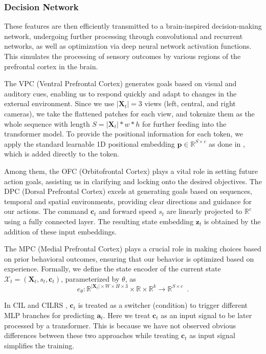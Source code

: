 \subsubsection{Decision Network}
These features are then efficiently transmitted to a brain-inspired decision-making network, undergoing further processing through convolutional and recurrent networks, as well as optimization via deep neural network activation functions. 
This simulates the processing of sensory outcomes by various regions of the prefrontal cortex in the brain. 
%


The VPC (Ventral Prefrontal Cortex) generates goals based on visual and auditory cues, enabling us to respond quickly and adapt to changes in the external environment.  
%
Since we use $|\mathbf{X}_{t}|=3$ views (left, central, and right cameras), we take the flattened patches for each view, and tokenize them as the whole sequence with length $S=|\mathbf{X}_t|*w*h$ for further feeding into the transformer model. 
To provide the positional information for each token, we apply the standard learnable 1D positional embedding $\mathbf{p}\in \mathbb{R}^{S\times c}$ as done in \cite{Alexey:2021}, which is added directly to the token. 


Among them, the OFC (Orbitofrontal Cortex) plays a vital role in setting future action goals, assisting us in clarifying and locking onto the desired objectives. 
The DPC (Dorsal Prefrontal Cortex) excels at generating goals based on sequences, temporal and spatial environments, providing clear directions and guidance for our actions.
The command $\mathbf{c}_t$ and forward speed $s_t$ are linearly projected to $\mathbb{R}^{c}$ using a fully connected layer.
The resulting state embedding $\mathbf{z}_t$ is obtained by the addition of these input embeddings. 


The MPC (Medial Prefrontal Cortex) plays a crucial role in making choices based on prior behavioral outcomes, ensuring that our behavior is optimized based on experience.
Formally, we define the state encoder of the current state $\mathcal{X}_t=(\mathbf{X}_t, s_t, \mathbf{c}_t)$, parameterized by $\theta$, as
\begin{equation}\label{eq:encoder}
	e_{\theta}: \mathbb{R}^{|\mathbf{X}_{t}|\times W\times H\times3}\times\mathbb{R}\times \mathbb{R}^k \rightarrow \mathbb{R}^{S \times c} \enspace .
\end{equation}


In CIL \cite{Codevilla:2018} and CILRS \cite{Codevilla:2019}, $\mathbf{c}_{t}$ is treated as a switcher (condition) to trigger different MLP branches for predicting $\mathbf{a}_{t}$. 
Here we treat $\mathbf{c}_{t}$ as an input signal to be later processed by a transformer. 
This is because we have not observed obvious differences between these two approaches while treating $\mathbf{c}_{t}$ as input signal simplifies the training. 


